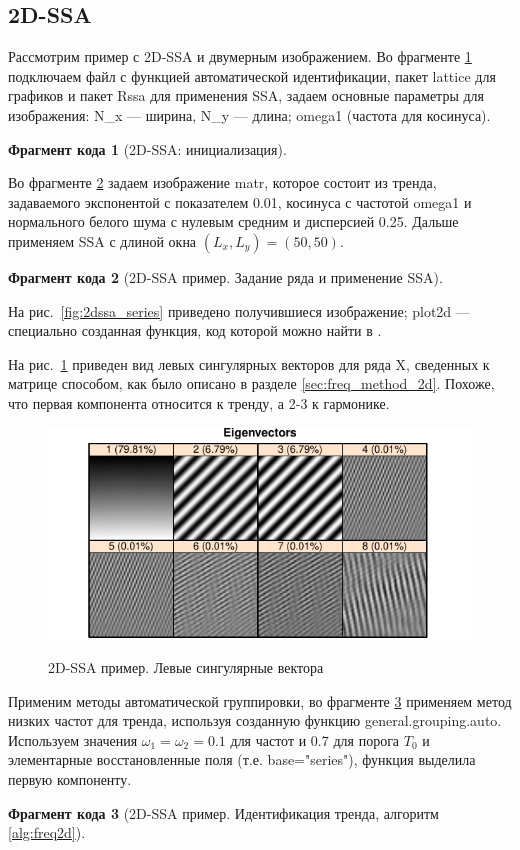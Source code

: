 \documentclass[specialist,
               substylefile = spbu.rtx,
               subf,href,colorlinks=true, 12pt]{disser}
\newtheorem{fragment}{Фрагмент кода}[section]
\newcommand{\bfgh}{\begin{figure}[!htbp]}
\newcommand{\efg}{\end{figure}}
\begin{document}
\subsection{2D-SSA}
Рассмотрим пример с 2D-SSA и двумерным изображением. Во фрагменте \ref{frag:2dssa_init} подключаем файл с функцией автоматической идентификации, пакет lattice для графиков и пакет Rssa для применения SSA, задаем основные параметры для изображения: N\_x --- ширина, N\_y --- длина; omega1 (частота для косинуса).
\begin{fragment}[2D-SSA: инициализация]
\label{frag:2dssa_init}

\end{fragment}
Во фрагменте \ref{frag:2dssa_series} задаем изображение matr, которое состоит из тренда, задаваемого экспонентой с показателем 0.01, косинуса с частотой omega1 и
 нормального белого шума с нулевым средним и дисперсией 0.25. 
Дальше применяем SSA с длиной окна $(L_x, L_y)=(50,50)$.
\begin{fragment}[2D-SSA пример. Задание ряда и применение SSA]
\label{frag:2dssa_series}

\end{fragment}
На рис.~\ref{fig:2dssa_series} приведено получившиеся изображение; plot2d --- специально созданная функция, код которой можно найти в \cite{polina_zhornikova_2018_1252476}.

На рис.~\ref{fig:2dssa_vectors} приведен вид левых сингулярных векторов для ряда X, сведенных к матрице способом, как было описано в разделе \ref{sec:freq_method_2d}. Похоже, что первая компонента относится к тренду, а 2-3 к гармонике.
\bfgh
        \begin{center}
{\includegraphics[width=4.5in]{2dssa_vectors}}
        \end{center}
        \caption{2D-SSA пример. Левые сингулярные вектора}
        \label{fig:2dssa_vectors}
\efg

Применим методы автоматической группировки, во фрагменте \ref{frag:2dssa_trend} применяем метод низких частот для тренда, используя созданную функцию general.grouping.auto. Используем значения $\omega_1 = \omega_2= 0.1$  для частот и 0.7 для порога $T_0$ и элементарные восстановленные поля (т.е. base="series"), функция выделила первую компоненту. 
\begin{fragment}[2D-SSA пример. Идентификация тренда, алгоритм \ref{alg:freq2d}]
\label{frag:2dssa_trend}

\end{fragment}
\end{document}
